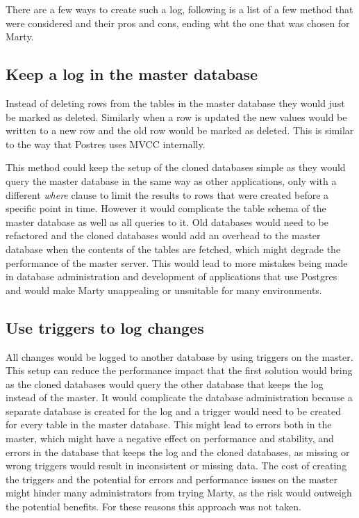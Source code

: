 \documentclass[a4paper,12pt,twoside,BCOR=10mm]{scrbook}
\begin{document}
There are a few ways to create such a log, following is a list of a few method that were considered and their pros and cons, ending wht the one that was chosen for Marty.

\subsection{Keep a log in the master database}
Instead of deleting rows from the tables in the master database they would just be marked as deleted. Similarly when a row is updated the new values would be written to a new row and the old row would be marked as deleted. This is similar to the way that Postres uses MVCC internally.

This method could keep the setup of the cloned databases simple as they would query the master database in the same way as other applications, only with a different \textit{where} clause to limit the results to rows that were created before a specific point in time. However it would complicate the table schema of the master database as well as all queries to it. Old databases would need to be refactored and the cloned databases would add an overhead to the master database when the contents of the tables are fetched, which might degrade the performance of the master server. This would lead to more mistakes being made in database administration and development of applications that use Postgres and would make Marty unappealing or unsuitable for many environments.

\subsection{Use triggers to log changes}
All changes would be logged to another database by using triggers on the master. This setup can reduce the performance impact that the first solution would bring as the cloned databases would query the other database that keeps the log instead of the master. It would complicate the database administration because a separate database is created for the log and a trigger would need to be created for every table in the master database. This might lead to errors both in the master, which might have a negative effect on performance and stability, and errors in the database that keeps the log and the cloned databases, as missing or wrong triggers would result in inconsistent or missing data. The cost of creating the triggers and the potential for errors and performance issues on the master might hinder many administrators from trying Marty, as the risk would outweigh the potential benefits. For these reasons this approach was not taken.
\end{document}
